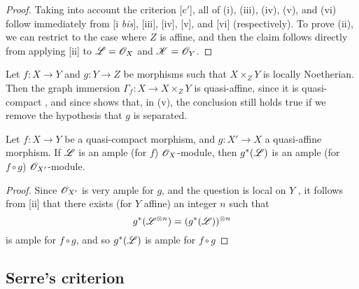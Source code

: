 \begin{proof}
\label{proof-II.5.1.10}
Taking into account the criterion [c$'$], all of (i), (iii), (iv), (v), and (vi) follow immediately from [i \emph{bis}], [iii], [iv], [v], and [vi] (respectively).
To prove (ii), we can restrict to the case where $Z$ is affine, and then the claim follows directly from applying [ii] to $\mathscr{L}=\mathscr{O}_X$ and $\mathscr{K}=\mathscr{O}_Y$.
\end{proof}

\begin{remark}[5.1.11]
\label{II.5.1.11}
Let $f:X\to Y$ and $g:Y\to Z$ be morphisms such that $X\times_Z Y$ is locally Noetherian.
Then the graph immersion $\Gamma_f:X\to X\times_Z Y$ is quasi-affine, since it is quasi-compact , and since  shows that, in (v), the conclusion still holds true if we remove the hypothesis that $g$ is separated.
\end{remark}

\begin{proposition}[5.1.12]
\label{II.5.1.12}
Let $f:X\to Y$ be a quasi-compact morphism, and $g:X'\to X$ a quasi-affine morphism.
If $\mathscr{L}$ is an ample (for $f$) $\mathscr{O}_X$-module, then $g^*(\mathscr{L})$ is an ample (for $f\circ g$) $\mathscr{O}_{X'}$-module.
\end{proposition}

\begin{proof}
\label{proof-II.5.1.12}
Since $\mathscr{O}_{X'}$ is very ample for $g$, and the question is local on $Y$ , it follows from [ii] that there exists (for $Y$ affine) an integer $n$ such that
\[
  g^*(\mathscr{L}^{\otimes n})=(g^*(\mathscr{L}))^{\otimes n}
\]
is ample for $f\circ g$, and so $g^*(\mathscr{L})$ is ample for $f\circ g$ 
\end{proof}

\subsection{Serre's criterion}
\label{subsection:II.5.2}

